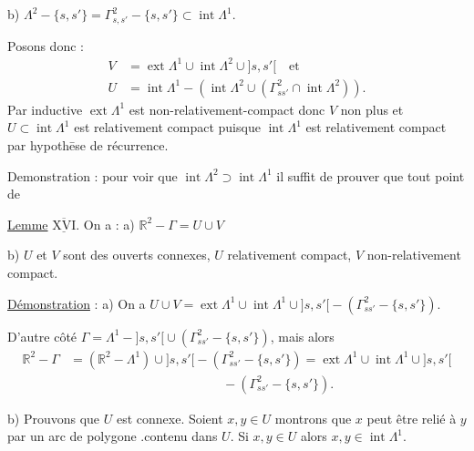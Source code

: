 b) $\Lambda^2-\{s,s'\}=\Gamma^2_{s,s'}-\{s,s'\}\subset\operatorname{int}\Lambda^1$.

Posons donc :
\[
\begin{aligned}
V&=\operatorname{ext}\Lambda^1\cup\operatorname{int}\Lambda^2\cup{]s,s'[}\quad\text{et}\\
U&=\operatorname{int}\Lambda^1-(\operatorname{int}\Lambda^2\cup(\Gamma^2_{ss'}\cap\operatorname{int}\Lambda^2)).
\end{aligned}
\]
Par  inductive $\operatorname{ext}\Lambda^1$ est non-relativement-compact donc $V$ non plus et $U\subset\operatorname{int}\Lambda^1$ est relativement compact puisque $\operatorname{int}\Lambda^1$ est relativement compact par hypothēse de récurrence.


Demonstration : pour voir que $\operatorname{int}\Lambda^2\supset\operatorname{int}\Lambda^1$ il suffit de prouver que tout point de

\uline{Lemme} $\underline{\overline{\mathrm{XVI}}}$. On a : a) $\mathbb R^2-\Gamma=U\cup V$

b) $U$ et $V$ sont des ouverts connexes, $U$ relativement compact, $V$ non-relativement compact.

\uline{Démonstration} : a) On a $U\cup V=\operatorname{ext}\Lambda^1\cup\operatorname{int}\Lambda^1\cup{]s,s'[}-(\Gamma^2_{ss'}-\{s,s'\})$.

D'autre côté $\Gamma=\Lambda^1-{]s,s'[}\cup(\Gamma^2_{ss'}-\{s,s'\})$, mais alors
\[
\begin{aligned}
\mathbb R^2-\Gamma&=(\mathbb R^2-\Lambda^1)\cup{]s,s'[}-(\Gamma^2_{ss'}-\{s,s'\})=\operatorname{ext}\Lambda^1\cup\operatorname{int}\Lambda^1\cup{]s,s'[}\\
&\hspace{12em}-(\Gamma^2_{ss'}-\{s,s'\}).
\end{aligned}
\]

b) Prouvons que $U$ est connexe. Soient $x,y\in U$\unsure{;|,} montrons que $x$ peut être relié à $y$ par un arc de polygone .contenu dans $U$. Si $x,y\in U$ alors $x,y\in\operatorname{int}\Lambda^1$.

